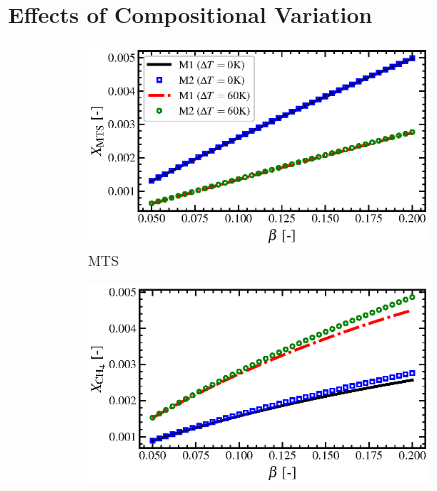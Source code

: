 \documentclass[final, letterpaper, square, comma, numbers, sort&compress]{elsarticle}
\begin{document}
\subsection{Effects of Compositional Variation}

\begin{figure}
    \centering
    \begin{subfigure}{0.49\textwidth}
        \centering
        \includegraphics[width=0.99\textwidth]{beta-vs-MTS-compare}
        \caption{MTS}
    \end{subfigure}
    \begin{subfigure}{0.49\textwidth}
        \centering
        \includegraphics[width=0.99\textwidth]{beta-vs-CH4-compare}

\end{subfigure}
\end{figure}
\end{document}
